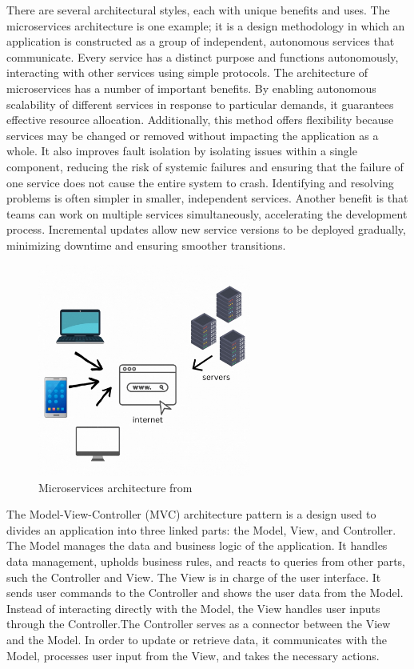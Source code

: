     There are several architectural styles, each with unique benefits and uses. The microservices architecture is one example; it is a design methodology in which an application is constructed as a group of independent, autonomous services that communicate. Every service has a distinct purpose and functions autonomously, interacting with other services using simple protocols. The architecture of microservices has a number of important benefits. By enabling autonomous scalability of different services in response to particular demands, it guarantees effective resource allocation. Additionally, this method offers flexibility because services may be changed or removed without impacting the application as a whole. It also improves fault isolation by isolating issues within a single component, reducing the risk of systemic failures and ensuring that the failure of one service does not cause the entire system to crash. Identifying and resolving problems is often simpler in smaller, independent services. Another benefit is that teams can work on multiple services simultaneously, accelerating the development process. Incremental updates allow new service versions to be deployed gradually, minimizing downtime and ensuring smoother transitions.
    \cite{Vicki}
    \begin{figure}[H]
        \centering
        \includegraphics[width=7cm]{chapters/2/figures/eb6b7a926564d8e2d83f58f00.jpg}
        \caption[Microservices architecture]{Microservices architecture  from~\cite{Vicki}}
        \label{fig:microservices-architecture}
    \end{figure}

    The Model-View-Controller (MVC) architecture pattern is a design used to divides an application into three linked parts: the Model, View, and Controller. The Model manages the data and business logic of the application. It handles data management, upholds business rules, and reacts to queries from other parts, such the Controller and View. The View is in charge of the user interface. It sends user commands to the Controller and shows the user data from the Model. Instead of interacting directly with the Model, the View handles user inputs through the Controller.The Controller serves as a connector between the View and the Model. In order to update or retrieve data, it communicates with the Model, processes user input from the View, and takes the necessary actions.
    \cite{GeeksforGeeks}

